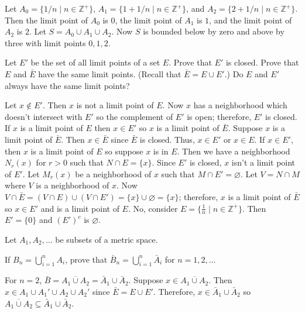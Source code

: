 \begin{exercise}
  Let \(A_0 = \{1/n\mid n\in\mathbb{Z}^+\}\),
  \(A_1 = \{1 + 1/n\mid n\in\mathbb{Z}^+\}\), and
  \(A_2 = \{2 + 1/n\mid n\in\mathbb{Z}^+\}\).
  Then the limit point of \(A_0\) is \(0\), the limit point of \(A_1\) is
  \(1\), and the limit point of \(A_2\) is \(2\).
  Let \(S = A_0\cup A_1\cup A_2\).
  Now \(S\) is bounded below by zero and above by three with limit points
  \(0,1,2\).
\item
  Let \(E'\) be the set of all limit points of a set \(E\).
  Prove that \(E'\) is closed.
  Prove that \(E\) and \(\bar{E}\) have the same limit points.
  (Recall that \(\bar{E} = E\cup E'\).)
  Do \(E\) and \(E'\) always have the same limit points?
  \par\smallskip
  Let \(x\not\in E'\).
  Then \(x\) is not a limit point of \(E\).
  Now \(x\) has a neighborhood which doesn't intersect with \(E'\) so the
  complement of \(E'\) is open; therefore, \(E'\) is closed.
  If \(x\) is a limit point of \(E\) then \(x\in E'\) so \(x\) is a limit point
  of \(\bar{E}\).
  Suppose \(x\) is a limit point of \(\bar{E}\).
  Then \(x\in\bar{E}\) since \(\bar{E}\) is closed.
  Thus, \(x\in E'\) or \(x\in E\).
  If \(x\in E'\), then \(x\) is a limit point of \(E\) so suppose \(x\) is in
  \(E\).
  Then we have a neighborhood \(N_r(x)\) for \(r > 0\) such that
  \(N\cap E = \{x\}\).
  Since \(E'\) is closed, \(x\) isn't a limit point of \(E'\).
  Let \(M_r(x)\) be a neighborhood of \(x\) such that
  \(M\cap E' = \varnothing\).
  Let \(V = N\cap M\) where \(V\) is a neighborhood of \(x\).
  Now
  \(V\cap\bar{E} = (V\cap E)\cup (V\cap E') = \{x\}\cup\varnothing = \{x\}\); therefore,
  \(x\) is a limit point of \(\bar{E}\) so \(x\in E'\) and is a limit point
  of \(E\).
  No, consider \(E = \{\frac{1}{n}\mid n\in\mathbb{Z}^+\}\).
  Then \(E' = \{0\}\) and \((E')^c\) is \(\varnothing\).
\item
  Let \(A_1, A_2, \ldots\) be subsets of a metric space.
  \begin{exercise}[label = (\alph*), ref = \arabic{exercisei} (\alph*)]
  \item
    \label{1.7.a}
    If \(B_n = \bigcup_{i = 1}^nA_i\), prove that
    \(\bar{B}_n = \bigcup_{i = 1}^n\bar{A}_i\) for \(n = 1, 2, \ldots\)
    \par\smallskip
    For \(n = 2\), \(\bar{B} = \overline{A_1\cup A_2} =
    \bar{A}_1\cup \bar{A}_2\).
    Suppose \(x\in\overline{A_1 \cup A_2}\).
    Then \(x\in A_1\cup A_1'\cup A_2\cup A_2'\) since \(\bar{E} = E\cup E'\).
    Therefore, \(x\in\bar{A}_1\cup\bar{A}_2\) so
    \(\overline{A_1\cup A_2}\subseteq\bar{A}_1\cup \bar{A}_2\).

\end{exercise}
\end{exercise}
